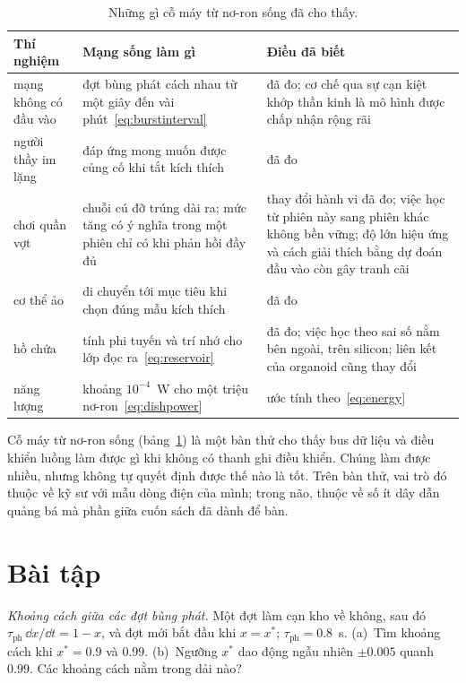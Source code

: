 \begin{table}[t]
\centering
\footnotesize
\setlength{\tabcolsep}{4pt}
\renewcommand{\arraystretch}{1.15}
\begin{tabular}{>{\raggedright}p{2.8cm}>{\raggedright}p{4.2cm}>{\raggedright\arraybackslash}p{5.8cm}}
\toprule
Thí nghiệm & Mạng sống làm gì & Điều đã biết \\
\midrule
mạng không có đầu vào & đợt bùng phát cách nhau từ một giây đến vài phút~\eqref{eq:burstinterval} & đã đo; cơ chế qua sự cạn kiệt khớp thần kinh là mô hình được chấp nhận rộng rãi \\
người thầy im lặng & đáp ứng mong muốn được củng cố khi tắt kích thích & đã đo \\
chơi quần vợt & chuỗi cú đỡ trúng dài ra; mức tăng có ý nghĩa trong một phiên chỉ có khi phản hồi đầy đủ & thay đổi hành vi đã đo; việc học từ phiên này sang phiên khác không bền vững; độ lớn hiệu ứng và cách giải thích bằng dự đoán đầu vào còn gây tranh cãi \\
cơ thể ảo & di chuyển tới mục tiêu khi chọn đúng mẫu kích thích & đã đo \\
hồ chứa & tính phi tuyến và trí nhớ cho lớp đọc ra~\eqref{eq:reservoir} & đã đo; việc học theo sai số nằm bên ngoài, trên silicon; liên kết của organoid cũng thay đổi \\
năng lượng & khoảng $10^{-4}$~W cho một triệu nơ-ron~\eqref{eq:dishpower} & ước tính theo~\eqref{eq:energy} \\
\bottomrule
\end{tabular}
\caption{Những gì cỗ máy từ nơ-ron sống đã cho thấy.}
\label{tab:livingmachine}
\end{table}

Cỗ máy từ nơ-ron sống (bảng~\ref{tab:livingmachine}) là một bàn thử cho thấy bus dữ liệu và điều khiển luồng làm được gì khi không có thanh ghi điều khiển. Chúng làm được nhiều, nhưng không tự quyết định được thế nào là tốt. Trên bàn thử, vai trò đó thuộc về kỹ sư với mẫu dòng điện của mình; trong não, thuộc về số ít dây dẫn quảng bá mà phần giữa cuốn sách đã dành để bàn.

\section{Bài tập}

\begin{exercise}[\lvlA]
\label{ex:21:1}
\emph{Khoảng cách giữa các đợt bùng phát.} Một đợt làm cạn kho về không, sau đó $\tau_{\text{ph}}\,\dd x/\dd t=1-x$, và đợt mới bắt đầu khi $x=x^*$; $\tau_{\text{ph}}=0.8$~s. (a)~Tìm khoảng cách khi $x^*=0.9$ và $0.99$. (b)~Ngưỡng $x^*$ dao động ngẫu nhiên $\pm0.005$ quanh $0.99$. Các khoảng cách nằm trong dải nào?
\end{exercise}

